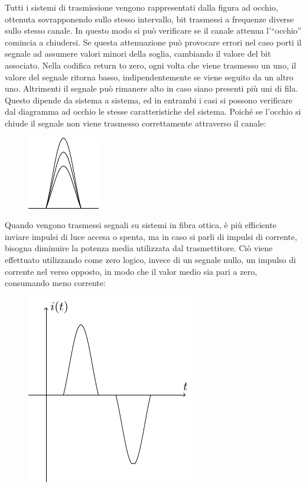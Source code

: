 \documentclass{article}
\numberwithin{equation}{subsection}
\begin{document}
Tutti i sistemi di trasmissione vengono rappresentati dalla figura ad occhio, ottenuta sovrapponendo sullo stesso intervallo, bit trasmessi a frequenze diverse sullo 
stesso canale. In questo modo si può verificare se il canale attenua l'``occhio'' comincia a chiudersi. Se questa attenuazione può provocare errori nel caso porti il 
segnale ad assumere valori minori della soglia, cambiando il valore del bit associato. 
Nella codifica return to zero, ogni volta che viene trasmesso un uno, il valore del segnale ritorna basso, indipendentemente se viene seguito da un altro uno. Altrimenti 
il segnale può rimanere alto in caso siano presenti più uni di fila. Questo dipende da sistema a sistema, ed in entrambi i casi si possono verificare dal diagramma ad occhio 
le stesse caratteristiche del sistema. Poiché se l'occhio si chiude il segnale non viene trasmesso correttamente attraverso il canale:
\begin{figure}[H]%
    \centering
    \includegraphics{diagramma-occhio.pdf}%
\end{figure}    
Quando vengono trasmessi segnali su sistemi in fibra ottica, è più efficiente inviare impulsi di luce accesa o spenta, ma in caso si parli di impulsi di corrente, 
bisogna diminuire la potenza media utilizzata dal trasmettitore. Ciò viene effettuato utilizzando come zero logico, invece di un segnale nullo, un impulso di corrente nel 
verso opposto, in modo che il valor medio sia pari a zero, consumando meno corrente:
\begin{figure}[H]%
    \centering
    \includegraphics{modulazione-corrente.pdf}%
\end{figure}
\end{document}
